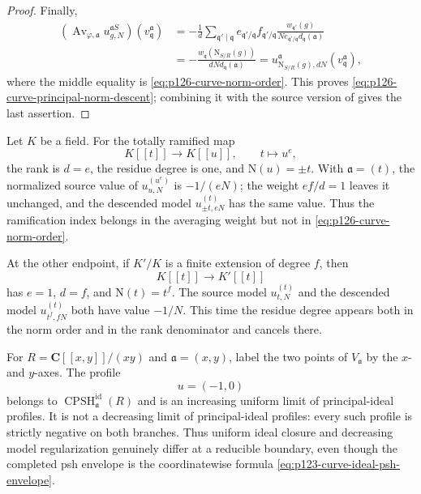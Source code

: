 \begin{proof}
Finally,
\[
 \begin{aligned}
 (\operatorname{Av}_{\varphi,\mathfrak a}
       u^{\mathfrak aS}_{g,N})(v_{\mathfrak q}^{\mathfrak a})
  &=-\frac1d\sum_{\mathfrak q'\mid\mathfrak q}
       e_{\mathfrak q'/\mathfrak q}f_{\mathfrak q'/\mathfrak q}
       \frac{w_{\mathfrak q'}(g)}
            {N e_{\mathfrak q'/\mathfrak q}
               d_{\mathfrak q}(\mathfrak a)}\\
  &=-\frac{w_{\mathfrak q}(\mathrm N_{S/R}(g))}
            {dN d_{\mathfrak q}(\mathfrak a)}
   =u^{\mathfrak a}_{\mathrm N_{S/R}(g),dN}
       (v_{\mathfrak q}^{\mathfrak a}),
 \end{aligned}
\]
where the middle equality is \eqref{eq:p126-curve-norm-order}.  This proves
\eqref{eq:p126-curve-principal-norm-descent}; combining it with the source
version of  gives the
last assertion.
\end{proof}

\begin{example}
\label{ex:p126-curve-norm-endpoint-weights}
Let \(K\) be a field.  For the totally ramified map
\[
 K[[t]]\longrightarrow K[[u]],\qquad t\longmapsto u^e,
\]
the rank is \(d=e\), the residue degree is one, and
\(\mathrm N(u)=\pm t\).  With \(\mathfrak a=(t)\), the normalized source
value of \(u^{(u^e)}_{u,N}\) is \(-1/(eN)\); the weight \(ef/d=1\) leaves
it unchanged, and the descended model
\(u^{(t)}_{\pm t,eN}\) has the same value.  Thus the ramification index
belongs in the averaging weight but not in
\eqref{eq:p126-curve-norm-order}.

At the other endpoint, if \(K'/K\) is a finite extension of degree \(f\),
then
\[
 K[[t]]\longrightarrow K'[[t]]
\]
has \(e=1\), \(d=f\), and \(\mathrm N(t)=t^f\).  The source model
\(u^{(t)}_{t,N}\) and the descended model
\(u^{(t)}_{t^f,fN}\) both have value \(-1/N\).  This time the residue
degree appears both in the norm order and in the rank denominator and
cancels there.
\end{example}

\begin{example}
\label{ex:p122-curve-ideal-psh-boundary}
For \(R=\mathbf C[[x,y]]/(xy)\) and
\(\mathfrak a=(x,y)\), label the two points of
\(V_{\mathfrak a}\) by the \(x\)- and \(y\)-axes.  The profile
\[
                             u=(-1,0)
\]
belongs to \(\operatorname{CPSH}^{\mathrm{id}}_{\mathfrak a}(R)\) and
is an increasing uniform limit of principal-ideal profiles.  It is not a
decreasing limit of principal-ideal profiles: every such profile is
strictly negative on both branches.  Thus uniform ideal closure and
decreasing model regularization genuinely differ at a reducible boundary,
even though the completed psh envelope is the coordinatewise formula
\eqref{eq:p123-curve-ideal-psh-envelope}.
\end{example}

